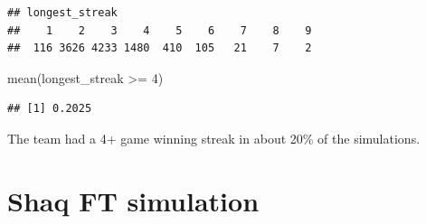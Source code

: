 \documentclass[
  11pt,
]{book}
\newenvironment{Shaded}{\begin{snugshade}}{\end{snugshade}}
\newcommand{\AttributeTok}[1]{\textcolor[rgb]{0.77,0.63,0.00}{#1}}
\newcommand{\CommentTok}[1]{\textcolor[rgb]{0.56,0.35,0.01}{\textit{#1}}}
\newcommand{\ConstantTok}[1]{\textcolor[rgb]{0.00,0.00,0.00}{#1}}
\newcommand{\ControlFlowTok}[1]{\textcolor[rgb]{0.13,0.29,0.53}{\textbf{#1}}}
\newcommand{\DecValTok}[1]{\textcolor[rgb]{0.00,0.00,0.81}{#1}}
\newcommand{\FloatTok}[1]{\textcolor[rgb]{0.00,0.00,0.81}{#1}}
\newcommand{\FunctionTok}[1]{\textcolor[rgb]{0.00,0.00,0.00}{#1}}
\newcommand{\NormalTok}[1]{#1}
\newcommand{\OtherTok}[1]{\textcolor[rgb]{0.56,0.35,0.01}{#1}}
\newcommand{\SpecialCharTok}[1]{\textcolor[rgb]{0.00,0.00,0.00}{#1}}
\theoremstyle{definition}
\theoremstyle{definition}
\theoremstyle{definition}
\theoremstyle{definition}
\theoremstyle{remark}
\begin{document}
\begin{Shaded}
\end{Shaded}

\begin{verbatim}
## longest_streak
##    1    2    3    4    5    6    7    8    9 
##  116 3626 4233 1480  410  105   21    7    2
\end{verbatim}

\begin{Shaded}
\begin{Highlighting}[]
\FunctionTok{mean}\NormalTok{(longest\_streak }\SpecialCharTok{\textgreater{}=} \DecValTok{4}\NormalTok{)}
\end{Highlighting}
\end{Shaded}

\begin{verbatim}
## [1] 0.2025
\end{verbatim}

The team had a 4+ game winning streak in about 20\% of the simulations.

\hypertarget{shaq-ft-simulation}{%
\section{Shaq FT simulation}\label{shaq-ft-simulation}}
\end{document}
